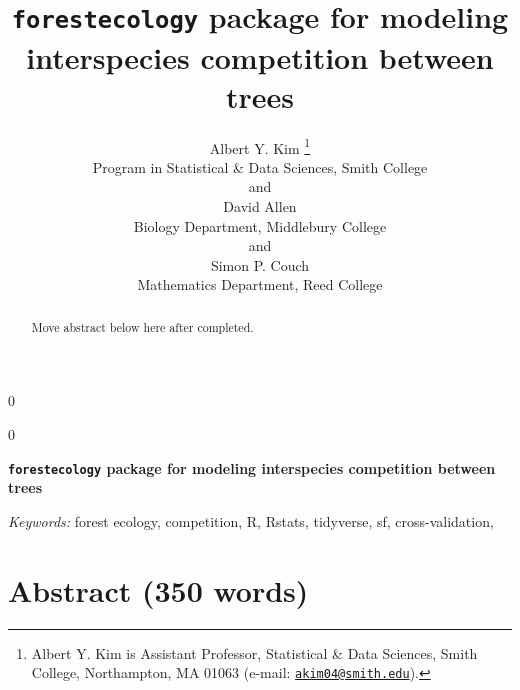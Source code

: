 \documentclass[12pt]{article}
\newcommand{\blind}{0}
\begin{document}
\def\spacingset#1{\renewcommand{\baselinestretch}%
{#1}\small\normalsize} \spacingset{1}



\blind
{
  \title{\bf \texttt{forestecology} package for modeling interspecies competition
between trees}

  \author{
        Albert Y. Kim \thanks{Albert Y. Kim is Assistant Professor, Statistical \& Data Sciences,
Smith College, Northampton, MA 01063 (e-mail:
\href{mailto:akim04@smith.edu}{\nolinkurl{akim04@smith.edu}}).} \\
    Program in Statistical \& Data Sciences, Smith College\\
     and \\     David Allen \\
    Biology Department, Middlebury College\\
     and \\     Simon P. Couch \\
    Mathematics Department, Reed College\\
      }
  \maketitle
} \fi

\blind
{
  \bigskip
  \bigskip
  \bigskip
  \begin{center}
    {\LARGE\bf \texttt{forestecology} package for modeling interspecies competition
between trees}
  \end{center}
  \medskip
} \fi

\bigskip
\begin{abstract}
Move abstract below here after completed.
\end{abstract}

\noindent%
{\it Keywords:} forest ecology, competition, R, Rstats, tidyverse, sf, cross-validation,
\vfill

\newpage
\spacingset{1.45} %

\linenumbers

\hypertarget{abstract-350-words}{%
\section{Abstract (350 words)}\label{abstract-350-words}}
\end{document}
